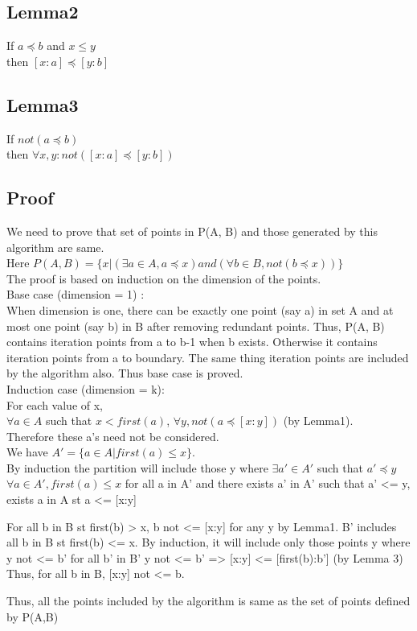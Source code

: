 \subsection{Lemma2}
If $a \preceq b$ and $x \leq y$ \\
then $[x:a] \preceq [y:b]$\\

\subsection{Lemma3}
If $not(a \preceq b)$\\
then $\forall x,y: not([x:a] \preceq [y:b])$\\

\subsection{Proof}

We need to prove that set of points in P(A, B) and those generated by this algorithm are same. \\
Here $P(A,B) = \{x | ( \exists a \in A, a \preceq x) and (\forall b \in B, not(b \preceq x))\}$ \\
The proof is based on induction on the dimension of the points.\\

Base case (dimension = 1) :\\
When dimension is one, there can be exactly one point (say a) in set A and at most one point (say b) in B after removing redundant points. Thus, P(A, B) contains iteration points from a to b-1 when b exists. Otherwise it contains iteration points from a to boundary. The same thing iteration points are included by the algorithm also. Thus base case is proved.\\

Induction case (dimension = k):\\

For each value of x, \\
$\forall a \in A$ such that $x < first(a)$, $\forall y, not(a \preceq [x:y])$ (by Lemma1). \\
Therefore these a's need not be considered.\\
We have $A' = \{a \in A | first(a) \leq x\}$.\\
By induction the partition will include those y where $\exists a' \in A'$ such that $a' \preceq y$\\
$\forall a \in A', first(a) \leq x$ for all a in A' and there exists a' in A' such that a' <= y, exists a in A st a <= [x:y]

For all b in B st first(b) > x, b not <= [x:y] for any y by Lemma1.
B' includes all b in B st first(b) <= x.
By induction, it will include only those points y where y not <= b' for all b' in B'
y not <= b' => [x:y] <= [first(b):b']  (by Lemma 3)
Thus, for all b in B, [x:y] not <= b.

Thus, all the points included by the algorithm is same as the set of points defined by P(A,B)

